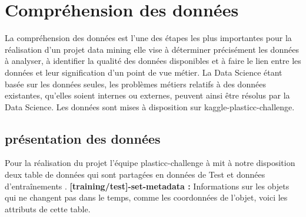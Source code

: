 \section{Compréhension des données}
La compréhension des données est l’une des étapes les plus importantes pour la réalisation d’un projet data mining elle vise à déterminer précisément les données à analyser, à identifier la qualité des données disponibles et à faire le lien entre les données
et leur signification d’un point de vue métier. La Data Science étant basée sur les données seules, les problèmes métiers relatifs à des données existantes, qu’elles soient internes ou externes, peuvent ainsi être résolus par la Data Science. Les données sont mises à
disposition sur kaggle-plasticc-challenge.

\subsection{présentation des données}
Pour la réalisation du projet l’équipe plasticc-challenge à mit à notre disposition deux table de données qui sont partagées en données de Test et données d’entraînements .
\newline
\newline
\textbf{[training/test]-set-metadata :} Informations sur les objets qui ne changent pas dans le temps, comme les coordonnées de l’objet, voici les attributs de cette table.
